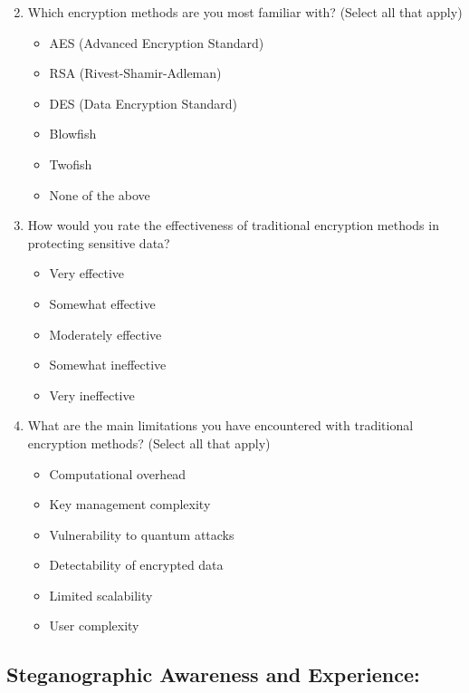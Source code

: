 \documentclass[12pt, a4paper, oneside]{book}
\begin{document}
\begin{enumerate}\setcounter{enumi}{1}
    \item Which encryption methods are you most familiar with? (Select all that apply)
    \begin{itemize}
        \item AES (Advanced Encryption Standard)
        \item RSA (Rivest-Shamir-Adleman)
        \item DES (Data Encryption Standard)
        \item Blowfish
        \item Twofish
        \item None of the above
    \end{itemize}

    \item How would you rate the effectiveness of traditional encryption methods in protecting sensitive data?
    \begin{itemize}
        \item Very effective
        \item Somewhat effective
        \item Moderately effective
        \item Somewhat ineffective
        \item Very ineffective
    \end{itemize}

    \item What are the main limitations you have encountered with traditional encryption methods? (Select all that apply)
    \begin{itemize}
        \item Computational overhead
        \item Key management complexity
        \item Vulnerability to quantum attacks
        \item Detectability of encrypted data
        \item Limited scalability
        \item User complexity
    \end{itemize}
\end{enumerate}

\subsection*{Steganographic Awareness and Experience:}
\end{document}
